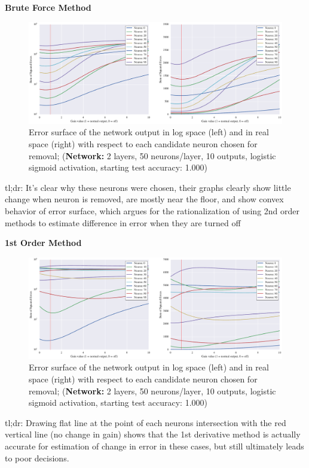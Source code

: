 \textbf{Brute Force Method}
\begin{figure}[!hb]
\centering
\includegraphics[width=\linewidth]{png/mnist-deep-gt-gain.pdf}
\caption{Error surface of the network output in log space (left) and in real space (right) with respect to each candidate neuron chosen for removal; (\textbf{Network:} 2 layers, 50 neurons/layer, 10 outputs, logistic sigmoid activation, starting test accuracy: 1.000)}
\label{fig:mnist-gt-double-layer}
\end{figure}
tl;dr: It's clear why these neurons were chosen, their graphs clearly show little change when neuron is removed, are mostly near the floor, and show convex behavior of error surface, which argues for the rationalization of using 2nd order methods to estimate difference in error when they are turned off

\textbf{1st Order Method}
\begin{figure}[!hb]
\centering
\includegraphics[width=\linewidth]{png/mnist-deep-g1-gain.pdf}
\caption{Error surface of the network output in log space (left) and in real space (right) with respect to each candidate neuron chosen for removal; (\textbf{Network:} 2 layers, 50 neurons/layer, 10 outputs, logistic sigmoid activation, starting test accuracy: 1.000)}
\label{fig:mnist-g1-double-layer}
\end{figure}
 tl;dr: Drawing flat line at the point of each neurons intersection with the red vertical line (no change in gain) shows that the 1st derivative method is actually accurate for estimation of change in error in these cases, but still ultimately leads to poor decisions. 

